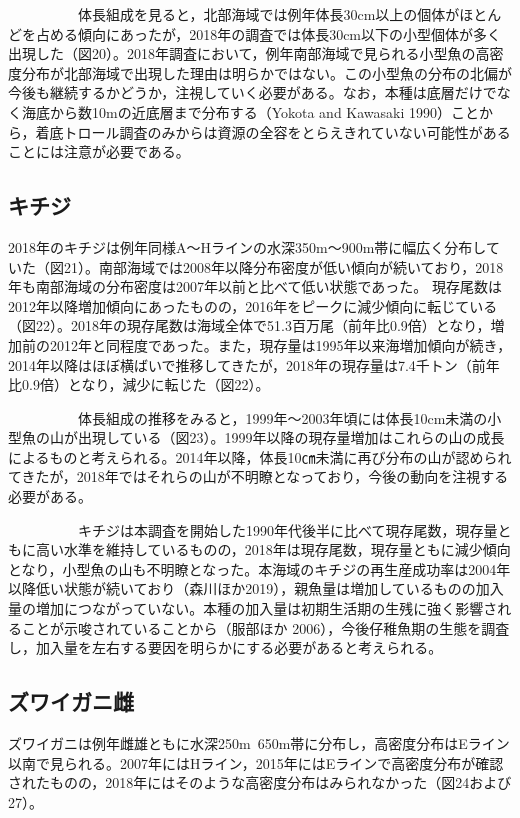 \documentclass[11pt]{article} %
\begin{document}
\begin{linenumbers}
\ \ \ \ \ \ \ \ \ \ 
体長組成を見ると，北部海域では例年体長30cm以上の個体がほとんどを占める傾向にあったが，2018年の調査では体長30cm以下の小型個体が多く出現した（図20）。2018年調査において，例年南部海域で見られる小型魚の高密度分布が北部海域で出現した理由は明らかではない。この小型魚の分布の北偏が今後も継続するかどうか，注視していく必要がある。なお，本種は底層だけでなく海底から数10mの近底層まで分布する（Yokota and Kawasaki 1990）ことから，着底トロール調査のみからは資源の全容をとらえきれていない可能性があることには注意が必要である。

\subsection{キチジ}
2018年のキチジは例年同様A～Hラインの水深350m～900m帯に幅広く分布していた（図21）。南部海域では2008年以降分布密度が低い傾向が続いており，2018年も南部海域の分布密度は2007年以前と比べて低い状態であった。
現存尾数は2012年以降増加傾向にあったものの，2016年をピークに減少傾向に転じている（図22）。2018年の現存尾数は海域全体で51.3百万尾（前年比0.9倍）となり，増加前の2012年と同程度であった。また，現存量は1995年以来海増加傾向が続き，2014年以降はほぼ横ばいで推移してきたが，2018年の現存量は7.4千トン（前年比0.9倍）となり，減少に転じた（図22）。

\ \ \ \ \ \ \ \ \ \ 
体長組成の推移をみると，1999年～2003年頃には体長10cm未満の小型魚の山が出現している（図23）。1999年以降の現存量増加はこれらの山の成長によるものと考えられる。2014年以降，体長10㎝未満に再び分布の山が認められてきたが，2018年ではそれらの山が不明瞭となっており，今後の動向を注視する必要がある。

\ \ \ \ \ \ \ \ \ \ 
キチジは本調査を開始した1990年代後半に比べて現存尾数，現存量ともに高い水準を維持しているものの，2018年は現存尾数，現存量ともに減少傾向となり，小型魚の山も不明瞭となった。本海域のキチジの再生産成功率は2004年以降低い状態が続いており（森川ほか2019），親魚量は増加しているものの加入量の増加につながっていない。本種の加入量は初期生活期の生残に強く影響されることが示唆されていることから（服部ほか 2006），今後仔稚魚期の生態を調査し，加入量を左右する要因を明らかにする必要があると考えられる。

\subsection{ズワイガニ雌}
ズワイガニは例年雌雄ともに水深250m~650m帯に分布し，高密度分布はEライン以南で見られる。2007年にはHライン，2015年にはEラインで高密度分布が確認されたものの，2018年にはそのような高密度分布はみられなかった（図24および27）。


\end{linenumbers}
\end{document}

